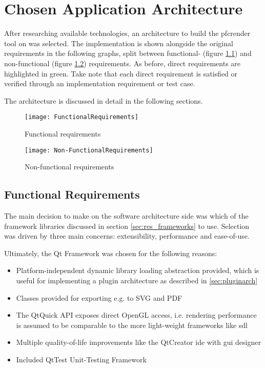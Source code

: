 \chapter{Chosen Application Architecture}

After researching available technologies, an architecture to build the pfcrender tool on was selected. The implementation is shown alongside the original requirements in the following graphs, split between functional- (figure \ref{fr}) and non-functional (figure \ref{nfr}) requirements. As before, direct requirements are highlighted in green. Take note that each direct requirement is satisfied or verified through an implementation requirement or test case.

The architecture is discussed in detail in the following sections.

\begin{figure}[p]
	\texttt{[image: FunctionalRequirements]}
	\caption{Functional requirements}
	\label{fr}
\end{figure}

\begin{figure}[p]
	\texttt{[image: Non-FunctionalRequirements]}
	\caption{Non-functional requirements}
	\label{nfr}
\end{figure}

\section{Functional Requirements}
The main decision to make on the software architecture side was which of the framework libraries discussed in section \ref{sec:res_frameworks} to use.
Selection was driven by three main concerns: extensibility, performance and ease-of-use.

Ultimately, the Qt Framework was chosen for the following reasons:
\begin{itemize}
	\item Platform-independent dynamic library loading abstraction provided, which is useful for implementing a plugin architecture as described in \ref{sec:pluginarch}
	\item Classes provided for exporting e.g. to SVG and PDF
	\item The QtQuick API exposes direct OpenGL access, i.e. rendering performance is assumed to be comparable to the more light-weight frameworks like \gls{sdl}
	\item Multiple quality-of-life improvements like the QtCreator \gls{ide} with \gls{gui} designer
	\item Included QtTest Unit-Testing Framework
\end{itemize}

